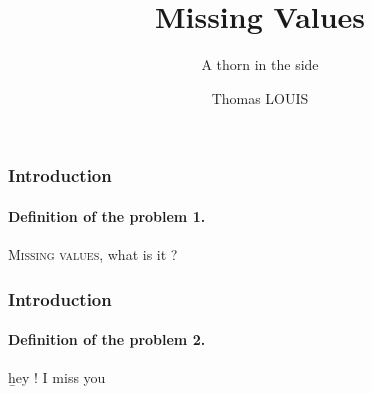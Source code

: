 \documentclass{beamer}
\title{Missing Values}
\subtitle{A thorn in the side}
\author{Thomas LOUIS}\institute{Data scientist}
\begin{document}
\begin{frame}
\titlepage
\end{frame}

\begin{frame}
  \frametitle{Introduction}
  \framesubtitle{Definition of the problem 1.}
  \textsc{Missing values}, what is it ?
\end{frame}

\begin{frame}
  \frametitle{Introduction}
  \framesubtitle{Definition of the problem 2.}
  \b{hey ! I miss you}
\end{frame}
\end{document}
